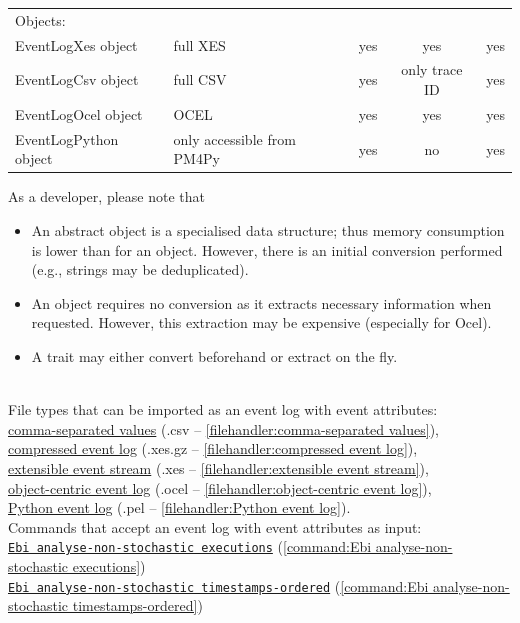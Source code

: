 {\begin{tabularx}{\linewidth}{XXccc}
            \midrule
            Objects:\\
            EventLogXes object & full XES & yes & yes & yes \\
            EventLogCsv object & full CSV & yes & only trace ID & yes \\
            EventLogOcel object & OCEL & yes & yes & yes \\
            EventLogPython object & only accessible from PM4Py & yes & no & yes \\
            \bottomrule
        \end{tabularx}
        As a developer, please note that 
        \begin{itemize}
            \item An abstract object is a specialised data structure; thus memory consumption is lower than for an object. 
            However, there is an initial conversion performed (e.g., strings may be deduplicated).
            \item An object requires no conversion as it extracts necessary information when requested.
            However, this extraction may be expensive (especially for Ocel).
            \item A trait may either convert beforehand or extract on the fly.
        \end{itemize}~
\\File types that can be imported as an event log with event attributes: \\\null\qquad\hyperref[filehandler:comma-separated values]{comma-separated values} (.csv -- \cref{filehandler:comma-separated values}), \\\null\qquad\hyperref[filehandler:compressed event log]{compressed event log} (.xes.gz -- \cref{filehandler:compressed event log}), \\\null\qquad\hyperref[filehandler:extensible event stream]{extensible event stream} (.xes -- \cref{filehandler:extensible event stream}), \\\null\qquad\hyperref[filehandler:object-centric event log]{object-centric event log} (.ocel -- \cref{filehandler:object-centric event log}), \\\null\qquad\hyperref[filehandler:Python event log]{Python event log} (.pel -- \cref{filehandler:Python event log}).
\\Commands that accept an event log with event attributes as input: \\\null\qquad\hyperref[command:Ebi analyse-non-stochastic executions]{\texttt{Ebi analyse-non-stochastic executions}} (\cref{command:Ebi analyse-non-stochastic executions})\\\null\qquad\hyperref[command:Ebi analyse-non-stochastic timestamps-ordered]{\texttt{Ebi analyse-non-stochastic timestamps-ordered}} (\cref{command:Ebi analyse-non-stochastic timestamps-ordered})
}
